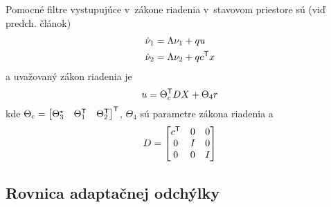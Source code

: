 \documentclass[a4paper, 10pt, ]{article}
\begin{document}
Pomocné filtre vystupujúce v~zákone riadenia v~stavovom priestore sú (viď predch. článok)
\begin{subequations} \label{vvMRAC_pomFiltre}
	\begin{align}
		\dot \nu_1 &= \Lambda \nu_1 + q u \\
		\dot \nu_2 &= \Lambda \nu_2 + q c^{\mathsf{T}} x
	\end{align}
\end{subequations}
a uvažovaný zákon riadenia je
\begin{equation}	\label{vvMRAC_uvZakRiad}
	u = \Theta_c^{\mathsf{T}} D X + \Theta_4 r
\end{equation}
kde $ \Theta_c = \begin{bmatrix} \Theta_3^\star  & \Theta_1^{\mathsf{T}} & \Theta_2^{\mathsf{T}} \end{bmatrix}^{\mathsf{T}}$, $\Theta_4$ sú parametre zákona riadenia a
\begin{align*}
	D = \begin{bmatrix} c^{\mathsf{T}} & 0 & 0 \\ 0 & I & 0 \\ 0 & 0 & I \end{bmatrix}
\end{align*}







\subsection{Rovnica adaptačnej odchýlky}
\end{document}
